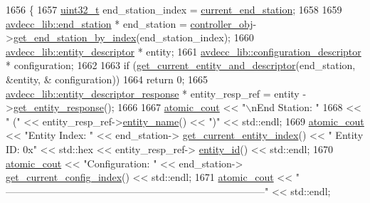 \begin{DoxyCode}
1656 \{
1657     \hyperlink{parse_8c_a6eb1e68cc391dd753bc8ce896dbb8315}{uint32\_t} end\_station\_index = \hyperlink{classcmd__line_a67c43393f654ad7bc5c7caf29634cede}{current\_end\_station};
1658 
1659     \hyperlink{classavdecc__lib_1_1end__station}{avdecc\_lib::end\_station} * end\_station = 
      \hyperlink{classcmd__line_af0a7784509e5bf1210a2aa19cea5df70}{controller\_obj}->\hyperlink{classavdecc__lib_1_1controller_a2a8ec1205ea0d5fdd6f833285257d0d0}{get\_end\_station\_by\_index}(end\_station\_index);
1660     \hyperlink{classavdecc__lib_1_1entity__descriptor}{avdecc\_lib::entity\_descriptor} * entity;
1661     \hyperlink{classavdecc__lib_1_1configuration__descriptor}{avdecc\_lib::configuration\_descriptor} * configuration;
1662 
1663     \textcolor{keywordflow}{if} (\hyperlink{classcmd__line_aa22ed7f036749918eb875043f10060c9}{get\_current\_entity\_and\_descriptor}(end\_station, &entity, &
      configuration))
1664         \textcolor{keywordflow}{return} 0;
1665     \hyperlink{classavdecc__lib_1_1entity__descriptor__response}{avdecc\_lib::entity\_descriptor\_response} * entity\_resp\_ref = entity
      ->\hyperlink{classavdecc__lib_1_1entity__descriptor_ac31dd117f0c931ae93c8ba52df7211bd}{get\_entity\_response}();
1666 
1667     \hyperlink{cmd__line_8h_a0bc38ccc65c79ba06c6fcd7b4bf554c3}{atomic\_cout} << \textcolor{stringliteral}{"\(\backslash\)nEnd Station: "}
1668                 << \textcolor{stringliteral}{" ("} << entity\_resp\_ref->\hyperlink{classavdecc__lib_1_1entity__descriptor__response_a3abd11ceacbf37b685377f2b73a502ca}{entity\_name}() << \textcolor{stringliteral}{")"} << std::endl;
1669     \hyperlink{cmd__line_8h_a0bc38ccc65c79ba06c6fcd7b4bf554c3}{atomic\_cout} << \textcolor{stringliteral}{"Entity Index: "} << end\_station->
      \hyperlink{classavdecc__lib_1_1end__station_aaf7e2defcfdf88c62c04fd88bd49787d}{get\_current\_entity\_index}() << \textcolor{stringliteral}{"  Entity ID: 0x"} << std::hex << entity\_resp\_ref->
      \hyperlink{classavdecc__lib_1_1entity__descriptor__response_a3374e7e9d63f8e1756480b16df9bc0c0}{entity\_id}() << std::endl;
1670     \hyperlink{cmd__line_8h_a0bc38ccc65c79ba06c6fcd7b4bf554c3}{atomic\_cout} << \textcolor{stringliteral}{"Configuration: "} << end\_station->
      \hyperlink{classavdecc__lib_1_1end__station_abaf546b5bb641dcf161f895e3d6d8cd8}{get\_current\_config\_index}() << std::endl;
1671     \hyperlink{cmd__line_8h_a0bc38ccc65c79ba06c6fcd7b4bf554c3}{atomic\_cout} << \textcolor{stringliteral}{"
      ------------------------------------------------------------------------------"} << std::endl;

\end{DoxyCode}
